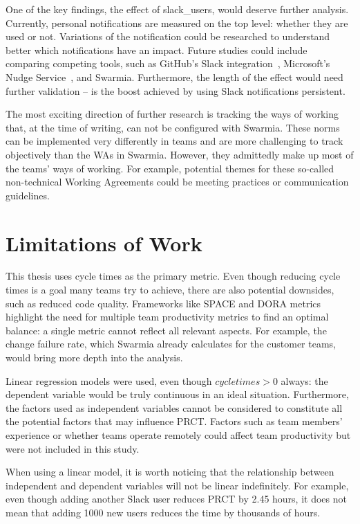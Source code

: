 One of the key findings, the effect of slack\_users, would deserve further analysis. Currently, personal notifications are measured on the top level: whether they are used or not. Variations of the notification could be researched to understand better which notifications have an impact. Future studies could include comparing competing tools, such as GitHub's Slack integration~\cite{slack_technologies_integrationsslack_2022}, Microsoft's Nudge Service~\cite{maddila_nudge_2022}, and Swarmia. Furthermore, the length of the effect would need further validation – is the boost achieved by using Slack notifications persistent.

The most exciting direction of further research is tracking the ways of working that, at the time of writing, can not be configured with Swarmia. These norms can be implemented very differently in teams and are more challenging to track objectively than the WAs in Swarmia. However, they admittedly make up most of the teams' ways of working. For example, potential themes for these so-called non-technical Working Agreements could be meeting practices or communication guidelines.

\section{Limitations of Work}

This thesis uses cycle times as the primary metric. Even though reducing cycle times is a goal many teams try to achieve, there are also potential downsides, such as reduced code quality. Frameworks like SPACE and DORA metrics highlight the need for multiple team productivity metrics to find an optimal balance: a single metric cannot reflect all relevant aspects. For example, the change failure rate, which Swarmia already calculates for the customer teams, would bring more depth into the analysis. 

Linear regression models were used, even though $cycle times > 0$ always: the dependent variable would be truly continuous in an ideal situation. Furthermore, the factors used as independent variables cannot be considered to constitute all the potential factors that may influence PRCT. Factors such as team members' experience or whether teams operate remotely could affect team productivity but were not included in this study. 
 
 When using a linear model, it is worth noticing that the relationship between independent and dependent variables will not be linear indefinitely. For example, even though adding another Slack user reduces PRCT by 2.45 hours, it does not mean that adding 1000 new users reduces the time by thousands of hours. 

